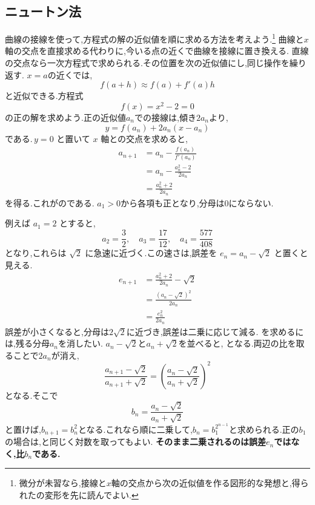 \subsection{ニュートン法}\label{節：ニュートン法型}

曲線の接線を使って,方程式の解の近似値を順に求める方法を考えよう.\footnote{微分が未習なら,接線と$x$軸の交点から次の近似値を作る図形的な発想と,得られたの変形を先に読んでよい.}
曲線と$x$軸の交点を直接求める代わりに,今いる点の近くで曲線を接線に置き換える.
直線の交点なら一次方程式で求められる.その位置を次の近似値にし,同じ操作を繰り返す.
$x=a$の近くでは,
\[
  f(a+h) \approx f(a)+f'(a)h
\]
と近似できる.方程式
\[
  f(x)=x^2-2=0
\]
の正の解を求めよう.正の近似値$a_n$での接線は,傾き$2a_n$より,
\[
  y=f(a_n)+2a_n(x-a_n)
\]
である.\,$y=0$ と置いて $x$ 軸との交点を求めると,
\begin{align*}
  a_{n+1}
    &=a_n-\frac{f(a_n)}{f'(a_n)}\\
    &=a_n-\frac{a_n^2-2}{2a_n}\\
    &=\frac{a_n^2+2}{2a_n}
\end{align*}
を得る.これがのである.
$a_1>0$から各項も正となり,分母は0にならない.
  \BookFigNewton

例えば $a_1=2$ とすると,
\[
  a_2=\frac{3}{2},
  \quad
  a_3=\frac{17}{12},
  \quad
  a_4=\frac{577}{408}
\]
となり,これらは $\sqrt{2}$ に急速に近づく.この速さは,誤差を
$e_n=a_n-\sqrt{2}$ と置くと見える.
\begin{align*}
  e_{n+1}
    &=\frac{a_n^2+2}{2a_n}-\sqrt{2}\\
    &=\frac{(a_n-\sqrt{2})^2}{2a_n}\\
    &=\frac{e_n^2}{2a_n}
\end{align*}
誤差が小さくなると,分母は$2\sqrt2$に近づき,誤差は二乗に応じて減る.
を求めるには,残る分母$a_n$を消したい.
$a_n-\sqrt2$と$a_n+\sqrt2$を並べると,
\BookMathLayout{
\[
\begin{aligned}
a_{n+1}-\sqrt2&=\frac{(a_n-\sqrt2)^2}{2a_n},\\
a_{n+1}+\sqrt2&=\frac{(a_n+\sqrt2)^2}{2a_n}
\end{aligned}
\]
}{
\[
\begin{aligned}
a_{n+1}-\sqrt2&=\frac{(a_n-\sqrt2)^2}{2a_n},\\
a_{n+1}+\sqrt2&=\frac{(a_n+\sqrt2)^2}{2a_n}
\end{aligned}
\]
}
となる.両辺の比を取ることで$2a_n$が消え,
\[
  \frac{a_{n+1}-\sqrt{2}}{a_{n+1}+\sqrt{2}}
  =\left(\frac{a_n-\sqrt{2}}{a_n+\sqrt{2}}\right)^{2}
\]
となる.そこで
\[
  b_n=\frac{a_n-\sqrt{2}}{a_n+\sqrt{2}}
\]
と置けば,$b_{n+1}=b_n^2$となる.これなら順に二乗して,$b_n=b_1^{2^{n-1}}$と求められる.正の$b_1$の場合は,と同じく対数を取ってもよい.
\textbf{そのまま二乗されるのは誤差$e_n$ではなく,比$b_n$である.}

